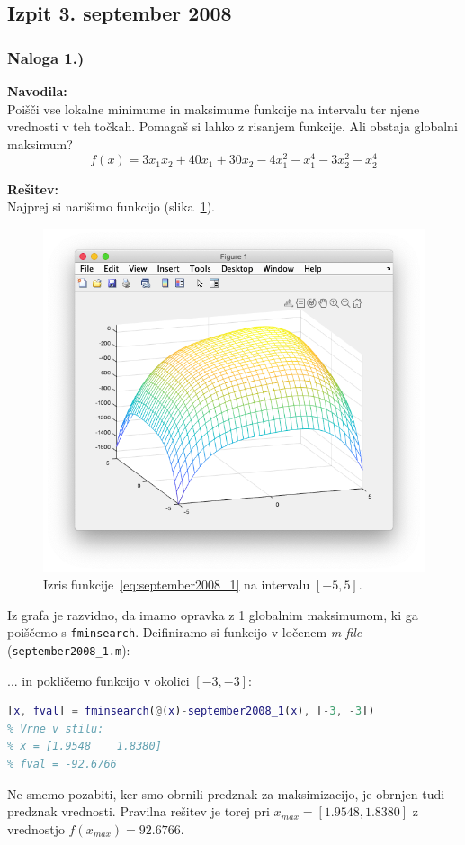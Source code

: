 \documentclass[a4paper,11pt]{article}
\begin{document}
\subsection{Izpit 3. september 2008}
\subsubsection{Naloga 1.)}

\textbf{Navodila:} \\ 
Poišči vse lokalne minimume in maksimume funkcije na intervalu ter njene vrednosti v teh točkah. Pomagaš si lahko z risanjem funkcije. Ali obstaja globalni maksimum?
\begin{equation} \label{eq:september2008_1}
	f(x) = 3x_1x_2 + 40x_1 + 30x_2 - 4x_1^2  - x_1^4 -3x_2^2 -x_2^4
\end{equation}

\textbf{Rešitev:} \\
Najprej si narišimo funkcijo (slika~\ref{img:september2008_1_plot}).

\begin{figure}[hbt]
	\centering
	\includegraphics[scale=.4]{images/september2008_1_plot.png}
	\caption{Izris funkcije~\ref{eq:september2008_1} na intervalu $[-5, 5]$.}
	\label{img:september2008_1_plot}
\end{figure}
Iz grafa je razvidno, da imamo opravka z 1 globalnim maksimumom, ki ga poiščemo s \texttt{fminsearch}. Deifiniramo si funkcijo v ločenem \textit{m-file} (\texttt{september2008\_1.m}):

... in pokličemo funkcijo v okolici $[-3, -3]$:
\begin{lstlisting}[language=Matlab]
[x, fval] = fminsearch(@(x)-september2008_1(x), [-3, -3])
% Vrne v stilu:
% x = [1.9548    1.8380]
% fval = -92.6766
\end{lstlisting}
Ne smemo pozabiti, ker smo obrnili predznak za maksimizacijo, je obrnjen tudi predznak vrednosti. Pravilna rešitev je torej pri $x_{max} = [1.9548, 1.8380]$ z vrednostjo $f(x_{max}) = 92.6766$.
\end{document}
